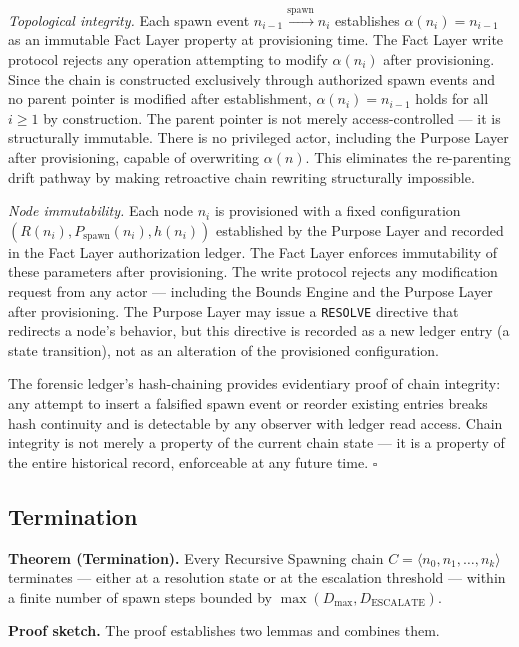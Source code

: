 \medskip
\textit{Topological integrity.} Each spawn event $n_{i-1} \xrightarrow{\mathrm{spawn}} n_i$ establishes $\alpha(n_i) = n_{i-1}$ as an immutable Fact Layer property at provisioning time. The Fact Layer write protocol rejects any operation attempting to modify $\alpha(n_i)$ after provisioning. Since the chain is constructed exclusively through authorized spawn events and no parent pointer is modified after establishment, $\alpha(n_i) = n_{i-1}$ holds for all $i \geq 1$ by construction. The parent pointer is not merely access-controlled — it is structurally immutable. There is no privileged actor, including the Purpose Layer after provisioning, capable of overwriting $\alpha(n)$. This eliminates the re-parenting drift pathway by making retroactive chain rewriting structurally impossible.

\medskip
\textit{Node immutability.} Each node $n_i$ is provisioned with a fixed configuration $(R(n_i), P_{\mathrm{spawn}}(n_i), h(n_i))$ established by the Purpose Layer and recorded in the Fact Layer authorization ledger. The Fact Layer enforces immutability of these parameters after provisioning. The write protocol rejects any modification request from any actor — including the Bounds Engine and the Purpose Layer after provisioning. The Purpose Layer may issue a \texttt{RESOLVE} directive that redirects a node's behavior, but this directive is recorded as a new ledger entry (a state transition), not as an alteration of the provisioned configuration.

The forensic ledger's hash-chaining provides evidentiary proof of chain integrity: any attempt to insert a falsified spawn event or reorder existing entries breaks hash continuity and is detectable by any observer with ledger read access. Chain integrity is not merely a property of the current chain state — it is a property of the entire historical record, enforceable at any future time. $\square$

\subsection{Termination}
\label{sec:rs-termination-proof}

\medskip
\noindent\textbf{Theorem (Termination).} Every Recursive Spawning chain $C = \langle n_0, n_1, \ldots, n_k \rangle$ terminates — either at a resolution state or at the escalation threshold — within a finite number of spawn steps bounded by $\max(D_{\mathrm{max}}, D_{\mathrm{ESCALATE}})$.

\medskip
\noindent\textbf{Proof sketch.} The proof establishes two lemmas and combines them.

